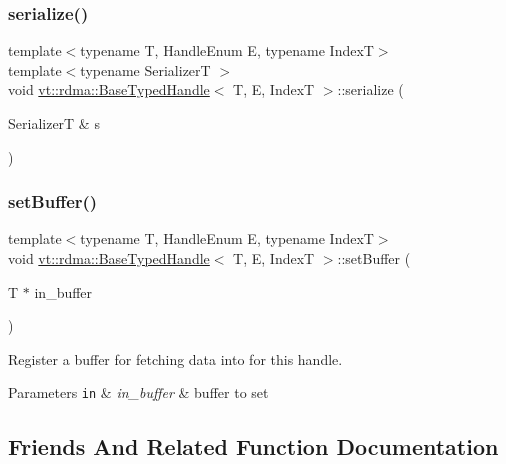 \subsubsection{\texorpdfstring{serialize()}{serialize()}}
{\footnotesize\ttfamily template$<$typename T, Handle\+Enum E, typename IndexT$>$ \\
template$<$typename SerializerT $>$ \\
void \hyperlink{structvt_1_1rdma_1_1_base_typed_handle}{vt\+::rdma\+::\+Base\+Typed\+Handle}$<$ T, E, IndexT $>$\+::serialize (\begin{DoxyParamCaption}\item[{SerializerT \&}]{s }\end{DoxyParamCaption})\hspace{0.3cm}{\ttfamily [inline]}}

\mbox{\label{structvt_1_1rdma_1_1_base_typed_handle_acd1c1ff4fa00ba44ff7d7d6d92e82e5b}} 
\subsubsection{\texorpdfstring{set\+Buffer()}{setBuffer()}}
{\footnotesize\ttfamily template$<$typename T, Handle\+Enum E, typename IndexT$>$ \\
void \hyperlink{structvt_1_1rdma_1_1_base_typed_handle}{vt\+::rdma\+::\+Base\+Typed\+Handle}$<$ T, E, IndexT $>$\+::set\+Buffer (\begin{DoxyParamCaption}\item[{T $\ast$}]{in\+\_\+buffer }\end{DoxyParamCaption})\hspace{0.3cm}{\ttfamily [inline]}}



Register a buffer for fetching data into for this handle. 


\begin{DoxyParams}[1]{Parameters}
\mbox{\tt in}  & {\em in\+\_\+buffer} & buffer to set \\
\hline
\end{DoxyParams}


\subsection{Friends And Related Function Documentation}
\mbox{\label{structvt_1_1rdma_1_1_base_typed_handle_a1fd6b9bc3f72bb2b64e602de3982929d}} 
